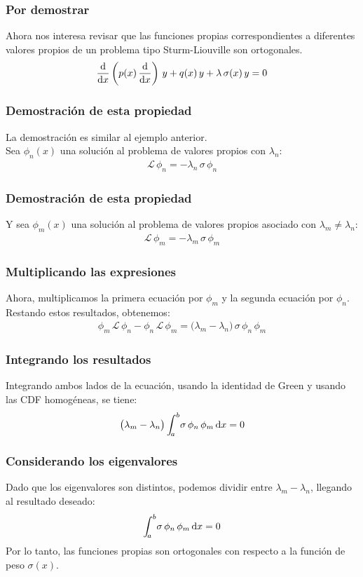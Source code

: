\documentclass[12pt]{beamer}
\begin{document}
\begin{frame}
\frametitle{Por demostrar}
Ahora nos interesa revisar que las funciones propias correspondientes a diferentes valores propios de un problema tipo Sturm-Liouville son ortogonales.
\pause
\begin{align*}
\dv{x} \left( p(x) \, \dv{x} \right) \, y + q(x) \, y + \lambda \, \sigma (x) \, y = 0
\end{align*}
\end{frame}
\begin{frame}
\frametitle{Demostración de esta propiedad}
La demostración es similar al ejemplo anterior.
\\
\bigskip
\pause
Sea $\phi_{n}(x)$ una solución al problema de valores propios con $\lambda_{n}$:
\pause
\begin{align*}
\mathcal{L} \, \phi_{n} = - \lambda_{n} \, \sigma \, \phi_{n}
\end{align*}
\end{frame}
\begin{frame}
\frametitle{Demostración de esta propiedad}
Y sea $\phi_{m}(x)$ una solución al problema de valores propios asociado con $\lambda_{m} \neq \lambda_{n}$:
\pause
\begin{align*}
\mathcal{L} \, \phi_{m} = - \lambda_{m} \, \sigma \, \phi_{m}
\end{align*}
\end{frame}
\begin{frame}
\frametitle{Multiplicando las expresiones}
Ahora, multiplicamos la primera ecuación por $\phi_{m}$ y la segunda ecuación por $\phi_{n}$. \pause Restando estos resultados, obtenemos:
\pause
\begin{align*}
\phi_{m}\, \mathcal{L} \, \phi_{n} - \phi_{n} \, \mathcal{L} \, \phi_{m} = \big( \lambda_{m} - \lambda_{n} \big) \, \sigma \, \phi_{n} \, \phi_{m}
\end{align*}
\end{frame}
\begin{frame}
\frametitle{Integrando los resultados}
Integrando ambos lados de la ecuación, usando la identidad de Green y usando las CDF homogéneas, se tiene:
\pause
\begin{align*}
\big( \lambda_{m} - \lambda_{n} \big) \, \scaleint{5ex}_{\bs a}^{b} \sigma \, \phi_{n} \, \phi_{m} \dd{x} = 0
\end{align*}
\end{frame}
\begin{frame}
\frametitle{Considerando los eigenvalores}
Dado que los eigenvalores son distintos, podemos dividir entre $\lambda_{m} - \lambda_{n}$, llegando al resultado deseado:
\pause
\begin{align*}
\scaleint{5ex}_{\bs a}^{b} \sigma \, \phi_{n} \, \phi_{m} \dd{x} = 0
\end{align*}
Por lo tanto, las funciones propias son ortogonales con respecto a la función de peso $\sigma(x)$.
\end{frame}
\end{document}
